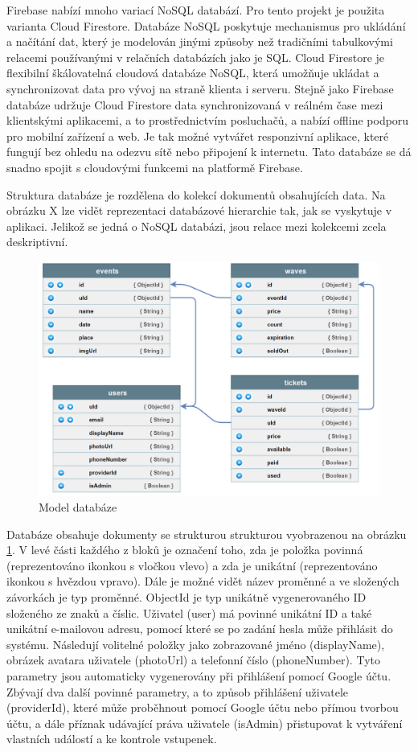 Firebase nabízí mnoho variací NoSQL databází. Pro tento projekt je použita varianta Cloud Firestore. Databáze NoSQL poskytuje mechanismus pro ukládání a načítání dat, který je modelován jinými způsoby než tradičními tabulkovými relacemi používanými v relačních databázích jako je SQL. Cloud Firestore je flexibilní škálovatelná cloudová databáze NoSQL, která umožňuje ukládat a synchronizovat data pro vývoj na straně klienta i serveru. Stejně jako Firebase databáze udržuje Cloud Firestore data synchronizovaná v reálném čase mezi klientskými aplikacemi, a to prostřednictvím posluchačů, a nabízí offline podporu pro mobilní zařízení a web. Je tak možné vytvářet responzivní aplikace, které fungují bez ohledu na odezvu sítě nebo připojení k internetu. Tato databáze se dá snadno spojit s cloudovými funkcemi na platformě Firebase.

Struktura databáze je rozdělena do kolekcí dokumentů obsahujících data. Na obrázku X lze vidět reprezentaci databázové hierarchie tak, jak se vyskytuje v aplikaci. Jelikož se jedná o NoSQL databázi, jsou relace mezi kolekcemi zcela deskriptivní.

\FloatBarrier
\begin{figure}[!htb]
\label{Database}
\centering
\includegraphics[width=\textwidth]{obrazky-figures/database.png}
\caption{Model databáze}
\end{figure}
\FloatBarrier

Databáze obsahuje dokumenty se strukturou strukturou vyobrazenou na obrázku \ref{Database}. V levé části každého z bloků je označení toho, zda je položka povinná (reprezentováno ikonkou s vločkou vlevo) a zda je unikátní (reprezentováno ikonkou s hvězdou vpravo). Dále je možné vidět název proměnné a ve složených závorkách je typ proměnné. ObjectId je typ unikátně vygenerovaného ID složeného ze znaků a číslic. Uživatel (user) má povinné unikátní ID a také unikátní e-mailovou adresu, pomocí které se po zadání hesla může přihlásit do systému. Následují volitelné položky jako zobrazované jméno (displayName), obrázek avatara uživatele (photoUrl) a telefonní číslo (phoneNumber). Tyto parametry jsou automaticky vygenerovány při přihlášení pomocí Google účtu. Zbývají dva další povinné parametry, a to způsob přihlášení uživatele (providerId), které může proběhnout pomocí Google účtu nebo přímou tvorbou účtu, a dále příznak udávající práva uživatele (isAdmin) přistupovat k vytváření vlastních událostí a ke kontrole vstupenek. 

